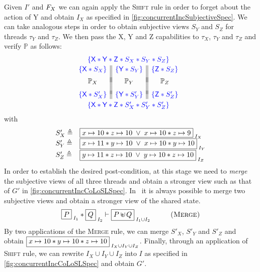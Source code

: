 Given $I'$ and $F_{X}$ we can again apply the \textsc{Shift} rule in order to forget about the action of \textsf{Y} and obtain $I_X$ as specified in \fig\ref{fig:concurrentIncSubjectiveSpec}. We can take analogous steps in order to obtain subjective views $S_Y$ and $S_Z$ for threads $\tau_Y$ and $\tau_Z$. We then pass the \textsf{X}, \textsf{Y} and \textsf{Z} capabilities to $\tau_X$, $\tau_Y$ and $\tau_Z$ and verify $\mathbb{P}$ as follows:
%
\[
\hspace*{-0.2cm}
\begin{array}{c}
	\color{blue}{\left\{\textsf{X} * \textsf{Y} *  \textsf{Z} *  S_X * S_Y * S_Z \right\}}\vspace*{2pt}\\
	
	\begin{array}{c || c || c}
		\color{blue}{\left\{\textsf{X} * S_X \right\}} & \color{blue}{\left\{\textsf{Y} * S_Y \right\}} & \color{blue}{\left\{\textsf{Z} * S_Z \right\}}\\
		&&\vspace*{-7pt}\\
		\mathbb{P}_X & \mathbb{P}_Y & \mathbb{P}_Z\\
		&&\vspace*{-5pt}\\

		\color{blue}{
			\left\{
					\textsf{X} * S'_X
			\right\}
		} 
		& 
		\color{blue}{
			\left\{
				\textsf{Y} * S'_Y
			\right\}
		} 

		&
		
		\color{blue}{
			\left\{
				\textsf{Z} * S'_Z
			\right\}
		} 		
		\vspace*{3pt}
	\end{array}\\
	\color{blue}{\left\{\textsf{X} * \textsf{Y} *  \textsf{Z} *  S'_X * S'_Y * S'_Z \right\}}\\
\end{array}
\]
%
with
%
\[
\begin{array}{l l}
	S'_X \triangleq & \boxed{x \mapsto 10 * z \mapsto 10 \;\lor\; x \mapsto 10 * z \mapsto 9 }_{\; I_X}\\
	S'_Y \triangleq & \boxed{x \mapsto 11 * y \mapsto 10 \;\lor\; x \mapsto 10 * y \mapsto 10 }_{\; I_Y}\\
	S'_Z \triangleq & \boxed{y \mapsto 11 * z \mapsto 10 \;\lor\; y \mapsto 10 * z \mapsto 10 }_{\; I_Z}
\end{array}
\]
%
In order to establish the desired post-condition, at this stage we need to \emph{merge} the subjective views of all three threads and obtain a stronger view such as that of $G'$ in \fig\ref{fig:concurrentIncCoLoSLSpec}. In \colosl\ it is always possible to merge two subjective views and obtain a stronger view of the shared state. 
%
\[
	\shared{P}{I_1} * \shared{Q}{I_2} \vdash \shared{P \sepish Q}{I_1 \cup I_2} \hspace*{1cm} \textsc{(Merge)}
\]
%
By two applications of the \textsc{Merge} rule, we can merge $S'_X$, $S'_Y$ and $S'_Z$ and obtain $\boxed{x \mapsto 10 * y \mapsto 10 * z \mapsto 10}_{\; I_X \cup I_Y \cup I_Z}$. Finally, through an application of \textsc{Shift} rule, we can rewrite $I_X \cup I_Y \cup I_Z$ into $I$ as specified in \fig\ref{fig:concurrentIncCoLoSLSpec} and obtain $G'$.
